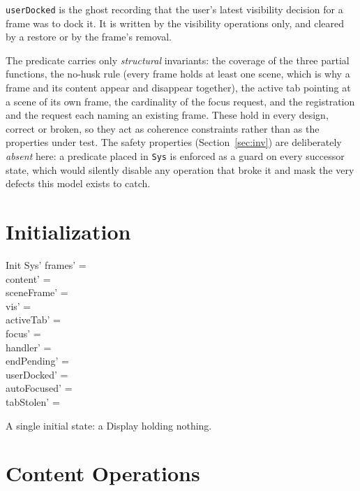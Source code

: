 \documentclass[a4paper,10pt,fleqn]{article}
\begin{document}
\texttt{userDocked} is the ghost recording that the user's latest visibility
decision for a frame was to dock it.  It is written by the visibility
operations only, and cleared by a restore or by the frame's removal.

The predicate carries only \emph{structural} invariants: the coverage of the
three partial functions, the no-husk rule (every frame holds at least one
scene, which is why a frame and its content appear and disappear together),
the active tab pointing at a scene of its own frame, the cardinality of the
focus request, and the registration and the request each naming an existing
frame.  These hold in every design, correct or broken, so they act as
coherence constraints rather than as the properties under test.  The safety
properties (Section~\ref{sec:inv}) are deliberately \emph{absent} here: a
predicate placed in \texttt{Sys} is enforced as a guard on every successor
state, which would silently disable any operation that broke it and mask the
very defects this model exists to catch.

\section{Initialization}

\begin{schema}{Init}
  Sys'
\where
  frames' = \emptyset \\
  content' = \emptyset \\
  sceneFrame' = \emptyset \\
  vis' = \emptyset \\
  activeTab' = \emptyset \\
  focus' = \emptyset \\
  handler' = \emptyset \\
  endPending' = \emptyset \\
  userDocked' = \emptyset \\
  autoFocused' = \emptyset \\
  tabStolen' = \emptyset
\end{schema}

A single initial state: a Display holding nothing.

\section{Content Operations}
\end{document}
